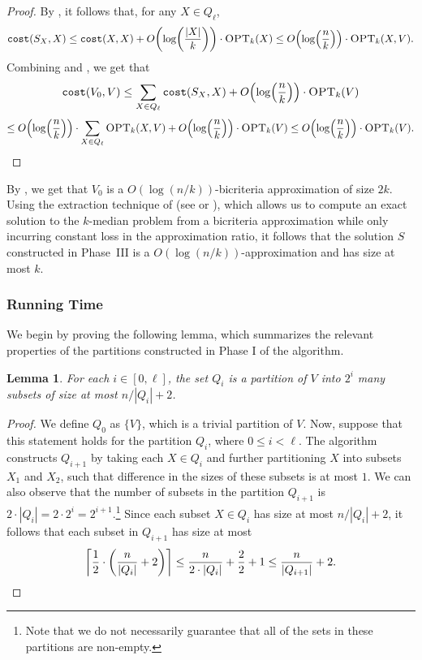 \documentclass[11pt]{article}
\newcommand{\1}{\mathmybb{1}}
\newtheorem{lemma}[theorem]{Lemma}
\newcommand{\OPT}{\textsc{OPT}}
\newcommand{\cost}{\textnormal{\texttt{cost}}}
\begin{document}
\begin{proof}
    By , it follows that, for any $X \in Q_\ell$,
\begin{equation}\label{eq:aaa}
    \cost(S_X, X) \leq \cost(X,X) + O \!\left( \log \! \left(\frac{|X|}{k} \right)\right) \cdot \OPT_k(X) \leq O \!\left( \log \! \left(\frac{n}{k} \right)\right) \cdot \OPT_k(X,V).
\end{equation}
Combining  and , we get that
$$ \cost(V_0, V) \leq \sum_{X \in Q_\ell} \cost(S_{X}, X) + O \!\left( \log \! \left(\frac{n}{k} \right)\right) \cdot \OPT_k(V) $$
$$ \leq O \!\left( \log \! \left(\frac{n}{k} \right)\right) \cdot \sum_{X \in Q_\ell} \OPT_k(X,V) + O \!\left( \log \! \left(\frac{n}{k} \right)\right) \cdot \OPT_k(V) \leq  O \!\left( \log \! \left(\frac{n}{k} \right)\right) \cdot \OPT_k(V). \qedhere $$
\end{proof}



By , we get that $V_0$ is a $O(\log(n/k))$-bicriteria approximation of size $2k$. Using the extraction technique of \cite{focs/GuhaMMO00} (see  or ), which allows us to compute an exact solution to the $k$-median problem from a bicriteria approximation while only incurring constant loss in the approximation ratio, it follows that the solution $S$ constructed in Phase~III is a $O(\log(n/k))$-approximation and has size at most $k$.

\subsubsection*{Running Time}

We begin by proving the following lemma, which summarizes the relevant properties of the partitions constructed in Phase I of the algorithm.

\begin{lemma}\label{lem:partitions:main}
    For each $i \in [0, \ell]$, the set $Q_i$ is a partition of $V$ into $2^i$ many subsets of size at most $n/|Q_i| + 2$.
\end{lemma}

\begin{proof}
    We define $Q_0$ as $\{V\}$, which is a trivial partition of $V$. Now, suppose that this statement holds for the partition $Q_i$, where $0 \leq i < \ell$. The algorithm constructs $Q_{i+1}$ by taking each $X \in Q_i$ and further partitioning $X$ into subsets $X_1$ and $X_{2}$, such that difference in the sizes of these subsets is at most $1$.
    We can also observe that the number of subsets in the partition $Q_{i+1}$ is $2 \cdot |Q_{i}| = 2 \cdot 2^{i} = 2^{i+1}$.\footnote{Note that we do not necessarily guarantee that all of the sets in these partitions are non-empty.} Since each subset $X \in Q_i$ has size at most $n/|Q_i| + 2$, it follows that each subset in $Q_{i+1}$ has size at most
    $$ \left\lceil \frac{1}{2} \cdot \left( \frac{n}{|Q_i|} + 2 \right) \right\rceil \leq \frac{n}{2 \cdot |Q_i|} + \frac{2}{2} + 1 \leq \frac{n}{|Q_{i+1}|} + 2.\qedhere $$
\end{proof}
\end{document}
